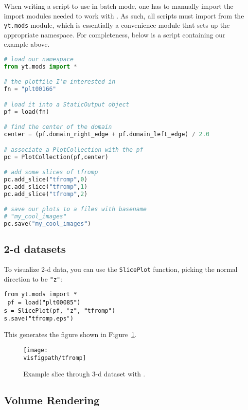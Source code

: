 When writing a script to use in batch mode, one has to manually import
the import modules needed to work with \yt.  As such, all scripts must
import from the {\tt yt.mods} module, which is essentially a
convenience module that sets up the appropriate \yt namespace.  
For completeness, below is a script containing our example above.
\begin{lstlisting}[language=Python]
# load our namespace
from yt.mods import *

# the plotfile I'm interested in
fn = "plt00166"

# load it into a StaticOutput object
pf = load(fn)

# find the center of the domain
center = (pf.domain_right_edge + pf.domain_left_edge) / 2.0

# associate a PlotCollection with the pf
pc = PlotCollection(pf,center)

# add some slices of tfromp
pc.add_slice("tfromp",0)
pc.add_slice("tfromp",1)
pc.add_slice("tfromp",2)

# save our plots to a files with basename
# "my_cool_images"
pc.save("my_cool_images")
\end{lstlisting}

\subsection{2-d datasets}

To visualize 2-d data, you can use the {\tt SlicePlot} function,
picking the normal direction to be {\tt "z"}:
\begin{lstlisting}
from yt.mods import *
 pf = load("plt00085")
s = SlicePlot(pf, "z", "tfromp")
s.save("tfromp.eps")
\end{lstlisting}
This generates the figure shown in Figure~\ref{fig:yt2d}.

\begin{figure}[!h]
\centering
\texttt{[image: \\visfigpath/tfromp]}
\caption{\label{fig:yt2d} Example slice through 3-d dataset with \yt.}
\end{figure}

\subsection{Volume Rendering}


